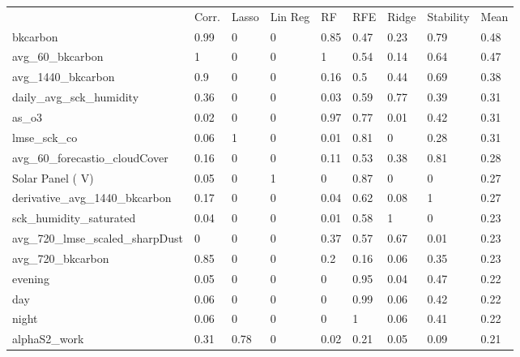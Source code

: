 \begin{table}[]
\centering
\small
\begin{tabular}{lllllllll}
\\
\\
\toprule
     & Corr. & Lasso & Lin Reg & RF   & RFE  & Ridge & Stability & Mean \\
\midrule
bkcarbon                          & 0.99  & 0     & 0          & 0.85 & 0.47 & 0.23  & 0.79      & 0.48 \\
avg\_60\_bkcarbon                 & 1     & 0     & 0          & 1    & 0.54 & 0.14  & 0.64      & 0.47 \\
avg\_1440\_bkcarbon               & 0.9   & 0     & 0          & 0.16 & 0.5  & 0.44  & 0.69      & 0.38 \\
daily\_avg\_sck\_humidity         & 0.36  & 0     & 0          & 0.03 & 0.59 & 0.77  & 0.39      & 0.31 \\
as\_o3                            & 0.02  & 0     & 0          & 0.97 & 0.77 & 0.01  & 0.42      & 0.31 \\
lmse\_sck\_co                     & 0.06  & 1     & 0          & 0.01 & 0.81 & 0     & 0.28      & 0.31 \\
avg\_60\_forecastio\_cloudCover   & 0.16  & 0     & 0          & 0.11 & 0.53 & 0.38  & 0.81      & 0.28 \\
Solar Panel ( V)                  & 0.05  & 0     & 1          & 0    & 0.87 & 0     & 0         & 0.27 \\
derivative\_avg\_1440\_bkcarbon   & 0.17  & 0     & 0          & 0.04 & 0.62 & 0.08  & 1         & 0.27 \\
sck\_humidity\_saturated          & 0.04  & 0     & 0          & 0.01 & 0.58 & 1     & 0         & 0.23 \\
avg\_720\_lmse\_scaled\_sharpDust & 0     & 0     & 0          & 0.37 & 0.57 & 0.67  & 0.01      & 0.23 \\
avg\_720\_bkcarbon                & 0.85  & 0     & 0          & 0.2  & 0.16 & 0.06  & 0.35      & 0.23 \\
evening                           & 0.05  & 0     & 0          & 0    & 0.95 & 0.04  & 0.47      & 0.22 \\
day                               & 0.06  & 0     & 0          & 0    & 0.99 & 0.06  & 0.42      & 0.22 \\
night                             & 0.06  & 0     & 0          & 0    & 1    & 0.06  & 0.41      & 0.22 \\
alphaS2\_work                     & 0.31  & 0.78  & 0          & 0.02 & 0.21 & 0.05  & 0.09      & 0.21 \\

\end{tabular}
\end{table}
